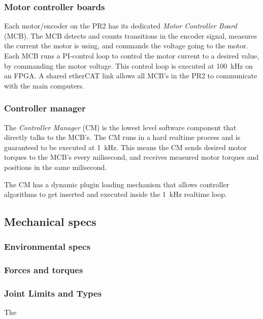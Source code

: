 \subsubsection{Motor controller boards}
Each motor/encoder on the PR2 has its dedicated \emph{Motor Controller
  Board} (MCB). The MCB detects and counts transitions in the encoder
signal, measures the current the motor is using, and commands the
voltage going to the motor. Each MCB runs a PI-control loop to control
the motor current to a desired value, by commanding the motor
voltage. This control loop is executed at 100~kHz on an FPGA.  A
shared etherCAT link allows all MCB's in the PR2 to communicate with
the main computers.

\subsubsection{Controller manager}
The \emph{Controller Manager} (CM) is the lowest level software
component that directly talks to the MCB's. The CM runs in a hard
realtime process and is guaranteed to be executed at 1~kHz. This means
the CM sends desired motor torques to the MCB's every milisecond, and
receives measured motor torques and positions in the same milisecond.

The CM has a dynamic plugin loading mechanism that allows controller
algorithms to get inserted and executed inside the 1~kHz realtime
loop.


\subsection{Mechanical specs}
\subsubsection{Environmental specs}
\subsubsection{Forces and torques}
\subsubsection{Joint Limits and Types}
The 

